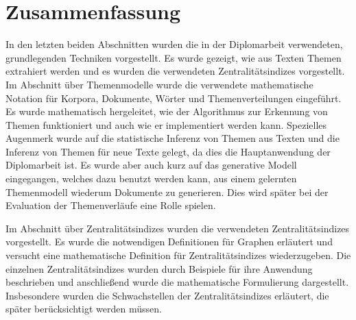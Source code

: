 \section{Zusammenfassung} 
In den letzten beiden Abschnitten wurden die in der Diplomarbeit verwendeten, grundlegenden Techniken vorgestellt. Es wurde gezeigt, wie aus Texten Themen extrahiert werden und es wurden die verwendeten Zentralitätsindizes vorgestellt. Im Abschnitt über Themenmodelle wurde die verwendete mathematische Notation für Korpora, Dokumente, Wörter und Themenverteilungen eingeführt. Es wurde mathematisch hergeleitet, wie der Algorithmus zur Erkennung von Themen funktioniert und auch wie er implementiert werden kann. Spezielles Augenmerk wurde auf die statistische Inferenz von Themen aus Texten und die Inferenz von Themen für neue Texte gelegt, da dies die Hauptanwendung der Diplomarbeit ist. Es wurde aber auch kurz auf das generative Modell eingegangen, welches dazu benutzt werden kann, aus einem gelernten Themenmodell wiederum Dokumente zu generieren. Dies wird später bei der Evaluation der Themenverläufe eine Rolle spielen.

Im Abschnitt über Zentralitätsindizes wurden die verwendeten Zentralitätsindizes vorgestellt. Es wurde die notwendigen Definitionen für Graphen erläutert und versucht eine mathematische Definition für Zentralitätsindizes wiederzugeben. Die einzelnen Zentralitätsindizes wurden durch Beispiele für ihre Anwendung beschrieben und anschließend wurde die mathematische Formulierung dargestellt. Insbesondere wurden die Schwachstellen der Zentralitätsindizes erläutert, die später berücksichtigt werden müssen. 